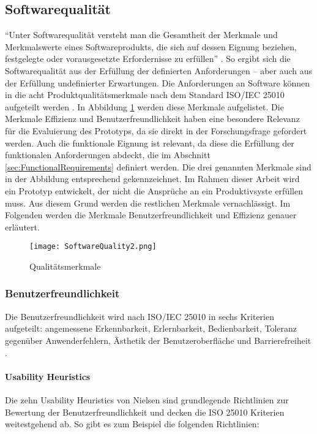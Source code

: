 \subsection{Softwarequalität}
``Unter Softwarequalität versteht man die Gesamtheit der Merkmale und Merkmalswerte eines Softwareprodukts, die sich auf dessen Eignung beziehen, festgelegte oder vorausgesetzte Erfordernisse zu erfüllen'' \cite[S.~257]{Balzert1998}. So ergibt sich die Softwarequalität aus der Erfüllung der definierten Anforderungen – aber auch aus der Erfüllung undefinierter Erwartungen. Die Anforderungen an Software können in die acht Produktqualitätsmerkmale nach dem Standard ISO/IEC 25010 aufgeteilt werden \cite[S.~3-4]{ISO25010}. In Abbildung \ref{fig:SoftwareQuality} werden diese Merkmale aufgelistet. Die Merkmale Effizienz und Benutzerfreundlichkeit haben eine besondere Relevanz für die Evaluierung des Prototyps, da sie direkt in der Forschungsfrage gefordert werden. Auch die funktionale Eignung ist relevant, da diese die Erfüllung der funktionalen Anforderungen abdeckt, die im Abschnitt \ref{sec:FunctionalRequirements} definiert werden. Die drei genannten Merkmale sind in der Abbildung entsprechend gekennzeichnet. Im Rahmen dieser Arbeit wird ein Prototyp entwickelt, der nicht die Ansprüche an ein Produktivsyste erfüllen muss. Aus diesem Grund werden die restlichen Merkmale vernachlässigt. Im Folgenden werden die Merkmale Benutzerfreundlichkeit und Effizienz genauer erläutert.

\begin{figure}[H]
    \caption{Qualitätsmerkmale}\label{fig:SoftwareQuality}
    \texttt{[image: SoftwareQuality2.png]}
\end{figure}

\subsubsection{Benutzerfreundlichkeit}
Die Benutzerfreundlichkeit wird nach ISO/IEC 25010 in sechs Kriterien aufgeteilt: angemessene Erkennbarkeit, Erlernbarkeit, Bedienbarkeit, Toleranz gegenüber Anwenderfehlern, Ästhetik der Benutzeroberfläche und Barrierefreiheit \cite[S.~4]{ISO25010}.

\paragraph{Usability Heuristics}
Die zehn Usability Heuristics von Nielsen sind grundlegende Richtlinien zur Bewertung der Benutzerfreundlichkeit \cite{Nielsen.1994} und decken die ISO 25010 Kriterien weitestgehend ab. So gibt es zum Beispiel die folgenden Richtlinien:


